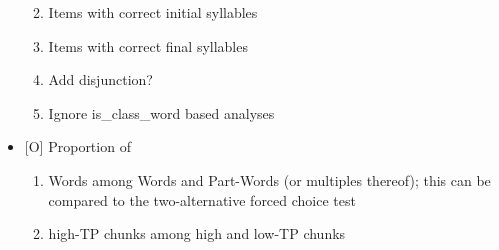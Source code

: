 \documentclass[]{article}
\providecommand{\tightlist}{%
  \setlength{\itemsep}{0pt}\setlength{\parskip}{0pt}}
\begin{document}
\begin{itemize}
  \begin{enumerate}
  \def\labelenumi{\alph{enumi}.}
  \tightlist
  \item
    Items with correct initial syllables
  \item
    Items with correct final syllables
  \item
    Add disjunction?
  \item
    Ignore is\_class\_word based analyses
  \end{enumerate}
\item
  {[}O{]} Proportion of

  \begin{enumerate}
  \def\labelenumi{\alph{enumi}.}
  \tightlist
  \item
    Words among Words and Part-Words (or multiples thereof); this can be
    compared to the two-alternative forced choice test
  \item
    high-TP chunks among high and low-TP chunks
  \end{enumerate}
\end{itemize}
\end{document}
